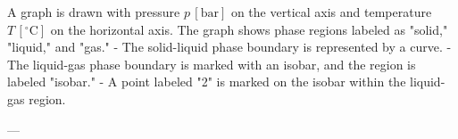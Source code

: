 A graph is drawn with pressure \( p \, [\text{bar}] \) on the vertical axis and temperature \( T \, [^\circ\text{C}] \) on the horizontal axis. The graph shows phase regions labeled as "solid," "liquid," and "gas."  
- The solid-liquid phase boundary is represented by a curve.  
- The liquid-gas phase boundary is marked with an isobar, and the region is labeled "isobar."  
- A point labeled "2" is marked on the isobar within the liquid-gas region.  

---
